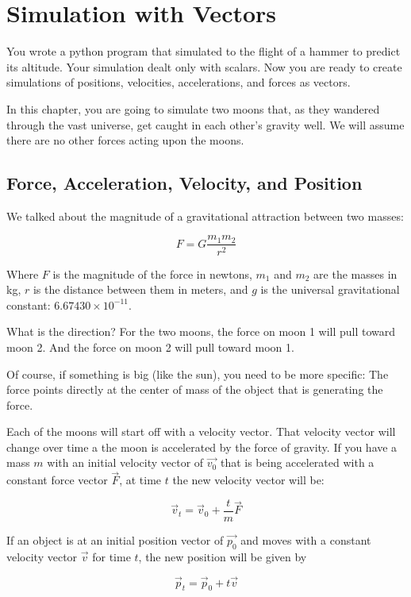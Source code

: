 \chapter{Simulation with Vectors}

You wrote a python program that simulated to the flight of a hammer to predict its altitude.   Your simulation
dealt only with scalars.  Now you are ready to create simulations of positions, velocities, accelerations, and forces as vectors.

In this chapter, you are going to simulate two moons that, as they wandered through the vast universe,  get caught
in each other's gravity well.   We will assume there are no other forces acting upon the moons.

\section{Force, Acceleration, Velocity, and Position}

We talked about the magnitude of a gravitational attraction between two masses:

$$F = G\frac{m_1 m_2}{r^2}$$

Where $F$ is the magnitude of the force in newtons, $m_1$ and $m_2$ are the masses in kg,  $r$ is the distance between them in meters, and $g$ is the universal gravitational constant: $6.67430 \times 10^{−11}$.

What is the direction?  For the two moons,  the force on moon 1 will pull toward moon 2.  
And the force on moon 2 will pull toward moon 1.
 
Of course,  if something is big (like the sun),  you need to be more specific:  The force points directly at the center
of mass of the object that is generating the force.

Each of the moons will start off with a velocity vector.   That velocity vector will change over time a the moon is
accelerated by the force of gravity.  If you have a mass $m$ with an initial velocity vector of $\vec{v_0}$ that is being accelerated with a constant force vector $\vec{F}$,  at time $t$ the new velocity vector will be:

$$\vec{v}_t = \vec{v}_0  + \frac{t}{m}  \vec{F}$$

If an object is at an initial position vector of $\vec{p_0}$ and moves with a constant velocity vector $\vec{v}$ 
for time $t$,  the new position will be given by 

$$\vec{p}_t = \vec{p}_0  + t \vec{v}$$

